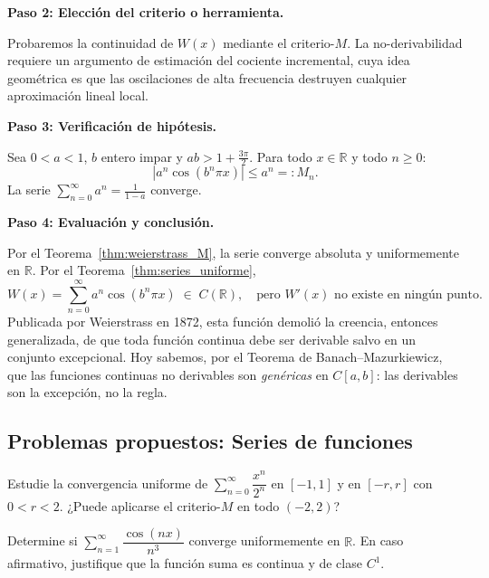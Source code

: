 \begin{example}
\begin{myproof}
\textbf{Paso 2: Elección del criterio o herramienta.}

Probaremos la continuidad de $W(x)$ mediante el criterio-$M$.
La no-derivabilidad requiere un argumento de estimación del cociente
incremental, cuya idea geométrica es que las oscilaciones de alta
frecuencia destruyen cualquier aproximación lineal local.

\textbf{Paso 3: Verificación de hipótesis.}

Sea $0 < a < 1$, $b$ entero impar y $ab > 1 + \frac{3\pi}{2}$.
Para todo $x \in \mathbb{R}$ y todo $n \geq 0$:
\[
    |a^n\cos(b^n\pi x)| \leq a^n =: M_n.
\]
La serie $\sum_{n=0}^\infty a^n = \frac{1}{1-a}$ converge.

\textbf{Paso 4: Evaluación y conclusión.}

Por el Teorema~\ref{thm:weierstrass_M}, la serie converge absoluta y
uniformemente en $\mathbb{R}$. Por el Teorema~\ref{thm:series_uniforme},
\[
    \boxed{W(x) = \sum_{n=0}^\infty a^n\cos(b^n\pi x)
    \;\in\; C(\mathbb{R}),
    \quad\text{pero } W'(x) \text{ no existe en ningún punto.}}
\]
Publicada por Weierstrass en 1872, esta función demolió la creencia,
entonces generalizada, de que toda función continua debe ser derivable
salvo en un conjunto excepcional. Hoy sabemos, por el Teorema de
Banach--Mazurkiewicz, que las funciones continuas no derivables son
\emph{genéricas} en $C[a,b]$: las derivables son la excepción, no la
regla.
\end{myproof}
\end{example}

\subsection{Problemas propuestos: Series de funciones}



\begin{prob}Estudie la convergencia uniforme de
          $\sum_{n=0}^\infty \dfrac{x^n}{2^n}$ en $[-1, 1]$ y en
          $[-r, r]$ con $0 < r < 2$. ¿Puede aplicarse el criterio-$M$
          en todo $(-2, 2)$?
\end{prob}


\begin{prob}
 Determine si $\sum_{n=1}^\infty \dfrac{\cos(nx)}{n^3}$
          converge uniformemente en $\mathbb{R}$. En caso afirmativo,
          justifique que la función suma es continua y de clase $C^1$.
\end{prob}

